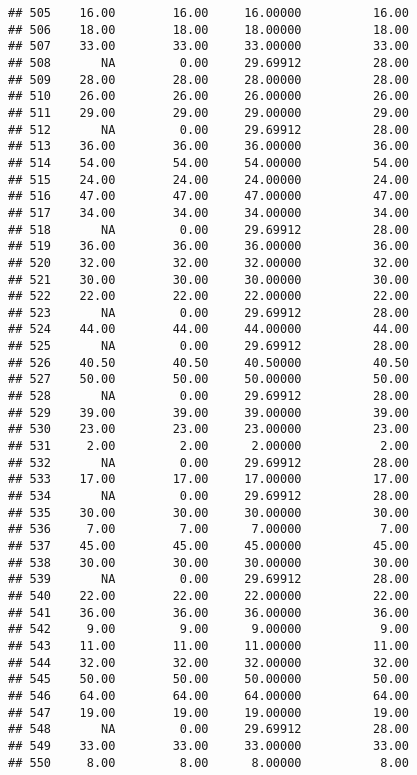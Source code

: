 \documentclass[
]{article}
\begin{document}
\begin{verbatim}
## 505    16.00        16.00     16.00000          16.00
## 506    18.00        18.00     18.00000          18.00
## 507    33.00        33.00     33.00000          33.00
## 508       NA         0.00     29.69912          28.00
## 509    28.00        28.00     28.00000          28.00
## 510    26.00        26.00     26.00000          26.00
## 511    29.00        29.00     29.00000          29.00
## 512       NA         0.00     29.69912          28.00
## 513    36.00        36.00     36.00000          36.00
## 514    54.00        54.00     54.00000          54.00
## 515    24.00        24.00     24.00000          24.00
## 516    47.00        47.00     47.00000          47.00
## 517    34.00        34.00     34.00000          34.00
## 518       NA         0.00     29.69912          28.00
## 519    36.00        36.00     36.00000          36.00
## 520    32.00        32.00     32.00000          32.00
## 521    30.00        30.00     30.00000          30.00
## 522    22.00        22.00     22.00000          22.00
## 523       NA         0.00     29.69912          28.00
## 524    44.00        44.00     44.00000          44.00
## 525       NA         0.00     29.69912          28.00
## 526    40.50        40.50     40.50000          40.50
## 527    50.00        50.00     50.00000          50.00
## 528       NA         0.00     29.69912          28.00
## 529    39.00        39.00     39.00000          39.00
## 530    23.00        23.00     23.00000          23.00
## 531     2.00         2.00      2.00000           2.00
## 532       NA         0.00     29.69912          28.00
## 533    17.00        17.00     17.00000          17.00
## 534       NA         0.00     29.69912          28.00
## 535    30.00        30.00     30.00000          30.00
## 536     7.00         7.00      7.00000           7.00
## 537    45.00        45.00     45.00000          45.00
## 538    30.00        30.00     30.00000          30.00
## 539       NA         0.00     29.69912          28.00
## 540    22.00        22.00     22.00000          22.00
## 541    36.00        36.00     36.00000          36.00
## 542     9.00         9.00      9.00000           9.00
## 543    11.00        11.00     11.00000          11.00
## 544    32.00        32.00     32.00000          32.00
## 545    50.00        50.00     50.00000          50.00
## 546    64.00        64.00     64.00000          64.00
## 547    19.00        19.00     19.00000          19.00
## 548       NA         0.00     29.69912          28.00
## 549    33.00        33.00     33.00000          33.00
## 550     8.00         8.00      8.00000           8.00

\end{verbatim}
\end{document}
